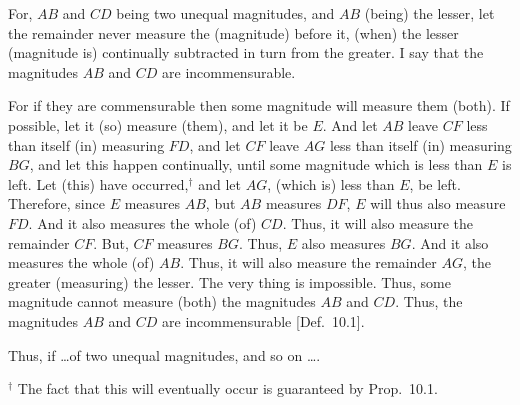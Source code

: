 \begin{Parallel}{}{}
{For, $AB$ and $CD$ being two unequal magnitudes, and $AB$ (being) the lesser, let the remainder
never measure the (magnitude) before it,
(when) the lesser (magnitude is) continually subtracted in turn from the greater. I say that
the magnitudes $AB$ and $CD$ are incommensurable.

For if they are commensurable then some magnitude will measure them (both). If possible, let it
(so) measure (them),  and let it be $E$. And let $AB$ leave $CF$
less than itself (in) measuring $FD$, and let $CF$ leave $AG$ less than
itself (in) measuring $BG$, and let this happen continually, until  some magnitude which is less than  $E$ is left. Let (this) have occurred,$^\dag$ and
let $AG$, (which is) less than $E$, be left. Therefore, since
$E$ measures $AB$, but $AB$ measures $DF$, $E$ will thus also measure $FD$. And it also measures the whole (of) $CD$. Thus, it will
also measure the remainder  $CF$. But, $CF$ measures $BG$. Thus,
$E$ also measures $BG$. And it also measures the whole (of) $AB$. 
Thus, it will also measure the remainder $AG$, the greater (measuring)
the lesser. The very thing is impossible. Thus, some magnitude cannot
measure (both) the magnitudes $AB$ and $CD$. Thus, the
magnitudes $AB$ and $CD$ are incommensurable [Def.~10.1].

Thus, if \ldots of two unequal magnitudes, and so on \ldots.}
\end{Parallel}
{\footnotesize\noindent$^\dag$ The fact that this will eventually occur is guaranteed by
Prop.~10.1.}

